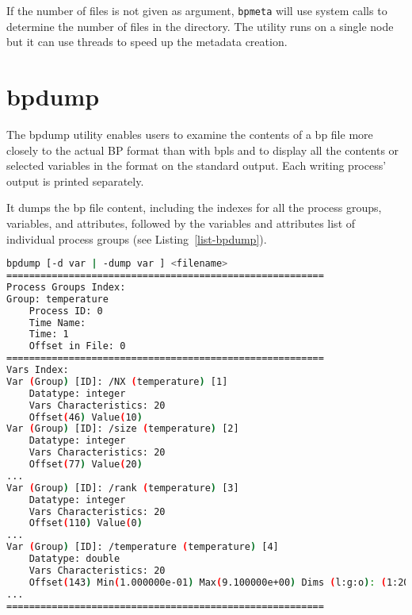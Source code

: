 If the number of files is not given as argument, \verb+bpmeta+ will use system calls to determine the number of files in the directory. The utility runs on a single node but it can use threads to speed up the metadata creation. 


\section{bpdump}

The bpdump utility enables users to examine the contents of a bp file more closely 
to the actual BP format than with bpls and to display all the contents or selected 
variables in the format on the standard output. Each writing process' output is 
printed separately. 

It dumps the bp file content, including the indexes for all the process groups, 
variables, and attributes, followed by the variables and attributes list of individual 
process groups (see Listing~\ref{list-bpdump}).

\begin{lstlisting}[language=bash,caption={bpdump utility},label={list-bpdump}]
bpdump [-d var | -dump var ] <filename>
======================================================== 
Process Groups Index:
Group: temperature
    Process ID: 0 
    Time Name:
    Time: 1 
    Offset in File: 0
========================================================
Vars Index:
Var (Group) [ID]: /NX (temperature) [1]
    Datatype: integer
    Vars Characteristics: 20
    Offset(46) Value(10)
Var (Group) [ID]: /size (temperature) [2] 
    Datatype: integer
    Vars Characteristics: 20 
    Offset(77) Value(20)
...
Var (Group) [ID]: /rank (temperature) [3] 
    Datatype: integer
    Vars Characteristics: 20 
    Offset(110) Value(0)
...
Var (Group) [ID]: /temperature (temperature) [4] 
    Datatype: double
    Vars Characteristics: 20
    Offset(143) Min(1.000000e-01) Max(9.100000e+00) Dims (l:g:o): (1:20:0,10:10:0)
...
========================================================
\end{lstlisting}

